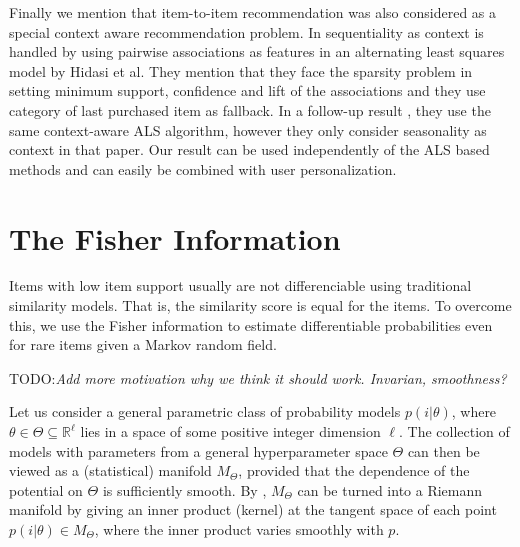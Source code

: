 
Finally we mention that item-to-item recommendation was also considered as a special context aware recommendation problem.
In \cite{hidasi2012fast} sequentiality as context is handled by using pairwise associations as features in an alternating least squares model by Hidasi et al.
They mention that they face the sparsity problem in setting minimum support, confidence and lift of the associations and they use category of last purchased item as fallback.
In a follow-up result \cite{hidasi2013context}, they use the same context-aware ALS algorithm, however they only consider seasonality as context in that paper.
Our result can be used independently of the ALS based methods and can easily be combined with user personalization.

\section{The Fisher Information}

Items with low item support usually are not differenciable using traditional similarity models. That is, the similarity score is equal for the items. To overcome this, we use the Fisher information to estimate differentiable probabilities even for rare items given a Markov random field.

TODO:\textit{Add more motivation why we think it should work. Invarian, smoothness?}

Let us consider a general parametric class of probability models $p(i| \theta)$, where $\theta\in \Theta \subseteq \mathbb{R}^\ell$ lies in a space 
of some positive integer dimension $\ell$. The collection of models with parameters from a general hyperparameter space $\Theta$ can then be viewed as a (statistical) manifold $M_\Theta$, provided that the dependence of the potential on $\Theta$ is sufficiently smooth. By \cite{Jo}, $M_\Theta$ can be turned into a Riemann manifold by giving an inner product (kernel) at the tangent space of each point $p(i| \theta) \in M_\Theta$, where the inner product varies smoothly with $p$. 

